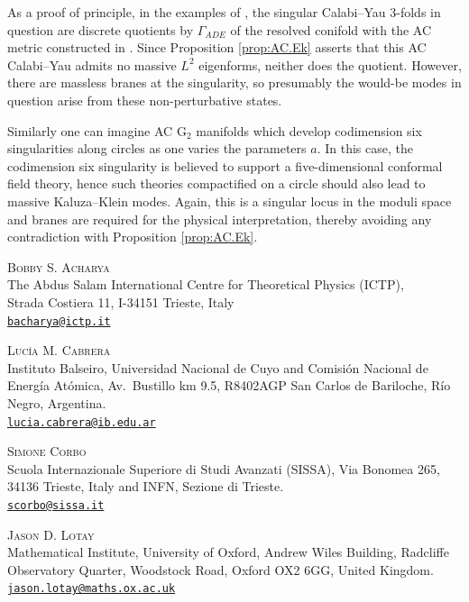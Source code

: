 \documentclass{article}
\theoremstyle{definition}
\numberwithin{thm}{section}
\numberwithin{equation}{section}
\begin{document}
As a proof of principle, in the examples of \cite{Acharya2}, the singular Calabi--Yau 3-folds in question are discrete quotients by $\Gamma_{ADE}$ of the resolved conifold with the AC metric constructed in \cite{CandelasDeLaOssa}. Since Proposition \ref{prop:AC.Ek} asserts that this AC Calabi--Yau admits no massive $L^2$ eigenforms, neither does the quotient. However, there are massless branes at the singularity, so presumably the would-be modes in question arise from these non-perturbative states.

Similarly one can imagine AC $\text{G}_2$ manifolds which develop codimension six singularities along  circles as one varies the parameters $a$. In this case, the codimension six singularity is believed to support a five-dimensional conformal field theory, hence such theories compactified on a circle should also lead to massive Kaluza--Klein modes.  Again, this is a singular locus in the moduli space and branes are required for the physical interpretation, thereby avoiding any contradiction with
Proposition \ref{prop:AC.Ek}. 





\bigskip

\begingroup
\small

\noindent
\textsc{Bobby S. Acharya}\\
The Abdus Salam International Centre for Theoretical Physics (ICTP),\\
Strada Costiera 11, I-34151 Trieste, Italy\\
\href{mailto:bacharya@ictp.it}{\texttt{bacharya@ictp.it}}

\medskip

\noindent
\textsc{Luc\'ia M. Cabrera}\\
Instituto Balseiro, Universidad Nacional de Cuyo and
Comisi\'on Nacional de Energ\'ia At\'omica,
Av.\ Bustillo km 9.5, R8402AGP San Carlos de Bariloche,
R\'io Negro, Argentina.\\
\href{mailto:lucia.cabrera@ib.edu.ar}
{\texttt{lucia.cabrera@ib.edu.ar}}

\medskip

\noindent
\textsc{Simone Corbo}\\
Scuola Internazionale Superiore di Studi Avanzati (SISSA),
Via Bonomea 265, 34136 Trieste, Italy and INFN, Sezione di Trieste.\\
\href{mailto:scorbo@sissa.it}{\texttt{scorbo@sissa.it}}

\medskip

\noindent
\textsc{Jason D. Lotay}\\
Mathematical Institute, University of Oxford,
Andrew Wiles Building, Radcliffe Observatory Quarter,
Woodstock Road, Oxford OX2 6GG, United Kingdom.\\
\href{mailto:jason.lotay@maths.ox.ac.uk}{\texttt{jason.lotay@maths.ox.ac.uk}}
\endgroup
 
\end{document}
